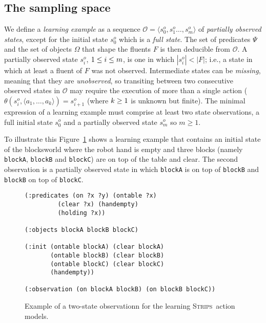 \documentclass{article}
\newcommand{\tup}[1]{{\langle #1 \rangle}}
\newcommand{\strips}{\textsc{Strips}}
\begin{document}
\subsection{The sampling space}
We define a {\em learning example} as a sequence $\mathcal{O}=\tup{s_0^o,s_1^o \ldots, s_m^o}$ of {\em partially observed states}, except for the initial state $s_0^o$ which is a {\em full state}. The set of predicates $\Psi$ and the set of objects $\Omega$ that shape the fluents $F$ is then deducible from $\mathcal{O}$. A partially observed state $s_i^o$, ${\small 1\leq i\leq m}$, is one in which $|s_i^o| < |F|$; i.e., a state in which at least a fluent of $F$ was not observed. Intermediate states can be {\em missing}, meaning that they are {\em unobserved}, so transiting between two consecutive observed states in $\mathcal{O}$ may require the execution of more than a single action ($\theta(s_i^o,\tup{a_1,\ldots,a_k})=s_{i+1}^o$ (where ${\small k\geq 1}$ is unknown but finite). The minimal expression of a learning example must comprise at least two state observations, a full initial state $s_0^o$ and a partially observed state $s_m^o$ so $m \geq 1$.

To illustrate this Figure~\ref{fig:observation} shows a learning example that contains an initial state of the blocksworld where the robot hand is empty and three blocks (namely {\small\tt blockA}, {\small\tt blockB} and {\small\tt blockC}) are on top of the table and clear. The second observation is a partially observed state in which {\tt blockA} is on top of {\tt blockB} and {\tt blockB} on top of {\tt blockC}.
\begin{figure}[hbt!]
  \begin{tiny}
  \begin{verbatim}
(:predicates (on ?x ?y) (ontable ?x)
	     (clear ?x) (handempty)
	     (holding ?x))

(:objects blockA blockB blockC)

(:init (ontable blockA) (clear blockA)
       (ontable blockB) (clear blockB)
       (ontable blockC) (clear blockC)
       (handempty))

(:observation (on blockA blockB) (on blockB blockC))
  \end{verbatim}
  \end{tiny}
	\caption{\small Example of a two-state observationn for the learning \strips\ action models.}
	\label{fig:observation}
\end{figure}
\end{document}
